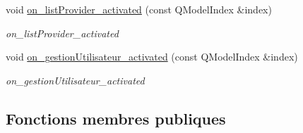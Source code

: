 \begin{DoxyCompactItemize}
void \mbox{\hyperlink{class_main_window_a5c37de425b15bf9117aae7b6b67df243}{on\+\_\+list\+Provider\+\_\+activated}} (const Q\+Model\+Index \&index)
\begin{DoxyCompactList}\small\item\em on\+\_\+list\+Provider\+\_\+activated \end{DoxyCompactList}\item 
void \mbox{\hyperlink{class_main_window_a9c3a8c1df5ed2f93b79333aeab5a3323}{on\+\_\+gestion\+Utilisateur\+\_\+activated}} (const Q\+Model\+Index \&index)
\begin{DoxyCompactList}\small\item\em on\+\_\+gestion\+Utilisateur\+\_\+activated \end{DoxyCompactList}\end{DoxyCompactItemize}
\subsection*{Fonctions membres publiques}
